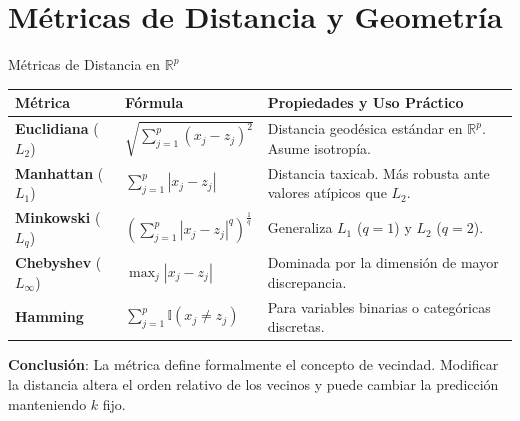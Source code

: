 \section{Métricas de Distancia y Geometría}

\begin{frame}{Métricas de Distancia en $\mathbb{R}^p$}
\footnotesize
\begin{center}
\renewcommand{\arraystretch}{1.15}
\begin{tabular}{llp{6.3cm}}
\toprule
\textbf{\textcolor{ccdenavy}{Métrica}} & \textbf{\textcolor{ccdenavy}{Fórmula}} & \textbf{\textcolor{ccdenavy}{Propiedades y Uso Práctico}} \\
\midrule
\textbf{Euclidiana} ($L_2$) & $\sqrt{\sum_{j=1}^p (x_j - z_j)^2}$ & Distancia geodésica estándar en $\mathbb{R}^p$. Asume isotropía. \\
\textbf{Manhattan} ($L_1$) & $\sum_{j=1}^p |x_j - z_j|$ & Distancia taxicab. Más robusta ante valores atípicos que $L_2$. \\
\textbf{Minkowski} ($L_q$) & $\left(\sum_{j=1}^p |x_j - z_j|^q\right)^{\frac{1}{q}}$ & Generaliza $L_1$ ($q=1$) y $L_2$ ($q=2$). \\
\textbf{Chebyshev} ($L_\infty$) & $\max_{j} |x_j - z_j|$ & Dominada por la dimensión de mayor discrepancia. \\
\textbf{Hamming} & $\sum_{j=1}^p \mathbb{I}(x_j \neq z_j)$ & Para variables binarias o categóricas discretas. \\
\bottomrule
\end{tabular}
\end{center}

\vspace{0.06cm}
\begin{keybox}
\footnotesize \textbf{Conclusión}: La métrica define formalmente el concepto de vecindad. Modificar la distancia altera el orden relativo de los vecinos y puede cambiar la predicción manteniendo $k$ fijo.
\end{keybox}
\end{frame}

